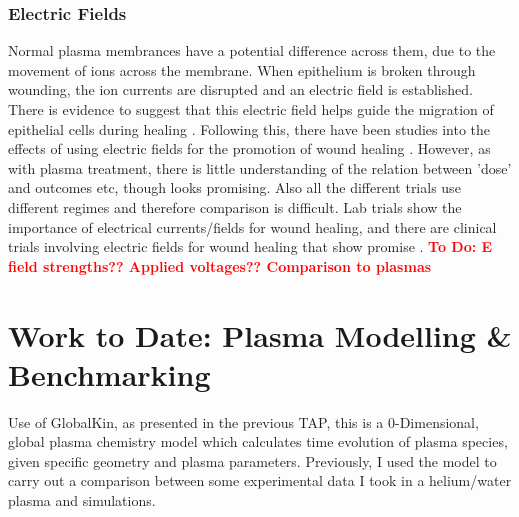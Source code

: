 \documentclass[11pt, oneside]{article}   	%
\newcommand{\todo}[1]{ \textcolor{red}{\bf{To Do:} #1}}
\begin{document}
%
%


\subsubsection{Electric Fields}

Normal plasma membrances have a potential difference across them, due to the movement of ions across the membrane.
When epithelium is broken through wounding, the ion currents are disrupted and an electric field is established.
There is evidence to suggest that this electric field helps guide the migration of epithelial cells during healing \cite{Zhao2009electrical}.
Following this, there have been studies into the effects of using electric fields for the promotion of wound healing \cite{Thakral2013electrical, Messerli2011extracellular}.
However, as with plasma treatment, there is little understanding of the relation between 'dose' and outcomes etc, though looks promising.
Also all the different trials use different regimes and therefore comparison is difficult.
Lab trials show the importance of electrical currents/fields for wound healing, and there are clinical trials involving electric fields for wound healing that show promise \cite{Messerli2011extracellular}.
\todo{E field strengths?? Applied voltages?? Comparison to plasmas}

\section{Work to Date: Plasma Modelling \& Benchmarking}
Use of GlobalKin, as presented in the previous TAP, this is a 0-Dimensional, global plasma chemistry model which calculates time evolution of plasma species, given specific geometry and plasma parameters.
Previously, I used the model to carry out a comparison between some experimental data I took in a helium/water plasma and simulations.
\end{document}
